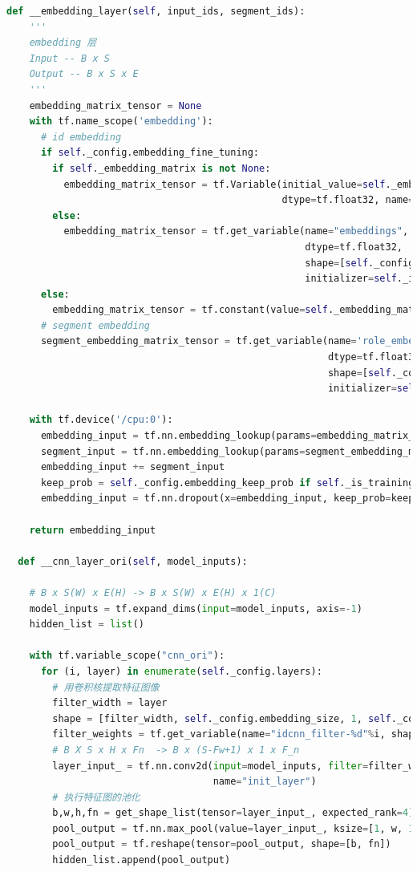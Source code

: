 \documentclass[twoside,a4paper,12pt]{book}%
\begin{document}
\begin{lstlisting}[language={python}]
  def __embedding_layer(self, input_ids, segment_ids):
    '''
    embedding 层
    Input -- B x S
    Output -- B x S x E
    '''
    embedding_matrix_tensor = None
    with tf.name_scope('embedding'):
      # id embedding
      if self._config.embedding_fine_tuning:
        if self._embedding_matrix is not None:
          embedding_matrix_tensor = tf.Variable(initial_value=self._embedding_matrix,
                                                dtype=tf.float32, name="embeddings")
        else:
          embedding_matrix_tensor = tf.get_variable(name="embeddings",
                                                    dtype=tf.float32,
                                                    shape=[self._config.vocab_size, self._config.embedding_size],
                                                    initializer=self._initializer)
      else:
        embedding_matrix_tensor = tf.constant(value=self._embedding_matrix, dtype=tf.float32, name="embeddings")
      # segment embedding
      segment_embedding_matrix_tensor = tf.get_variable(name='role_embedding',
                                                        dtype=tf.float32,
                                                        shape=[self._config.segment_size, self._config.embedding_size],
                                                        initializer=self._initializer)

    with tf.device('/cpu:0'):
      embedding_input = tf.nn.embedding_lookup(params=embedding_matrix_tensor, ids=input_ids)
      segment_input = tf.nn.embedding_lookup(params=segment_embedding_matrix_tensor, ids=segment_ids)
      embedding_input += segment_input
      keep_prob = self._config.embedding_keep_prob if self._is_training else 1.0
      embedding_input = tf.nn.dropout(x=embedding_input, keep_prob=keep_prob)

    return embedding_input

  def __cnn_layer_ori(self, model_inputs):

    # B x S(W) x E(H) -> B x S(W) x E(H) x 1(C)
    model_inputs = tf.expand_dims(input=model_inputs, axis=-1)
    hidden_list = list()

    with tf.variable_scope("cnn_ori"):
      for (i, layer) in enumerate(self._config.layers):
        # 用卷积核提取特征图像
        filter_width = layer
        shape = [filter_width, self._config.embedding_size, 1, self._config.filter_num]
        filter_weights = tf.get_variable(name="idcnn_filter-%d"%i, shape=shape, initializer=self._initializer)
        # B X S x H x Fn  -> B x (S-Fw+1) x 1 x F_n
        layer_input_ = tf.nn.conv2d(input=model_inputs, filter=filter_weights, strides=[1, 1, 1, 1], padding="VALID",
                                    name="init_layer")
        # 执行特征图的池化
        b,w,h,fn = get_shape_list(tensor=layer_input_, expected_rank=4)
        pool_output = tf.nn.max_pool(value=layer_input_, ksize=[1, w, 1, 1], strides=[1, 1, 1, 1], padding='VALID')
        pool_output = tf.reshape(tensor=pool_output, shape=[b, fn])
        hidden_list.append(pool_output)


\end{lstlisting}
\end{document}
